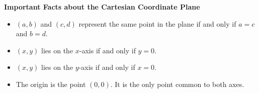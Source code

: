 \colorbox{ResultColor}{\bbm


\centerline{\textbf{Important Facts about the Cartesian Coordinate Plane}}

\begin{itemize}

\item $(a,b)$ and $(c,d)$ represent the same point in the plane if and only if $a = c$ and $b = d$.

\item  $(x,y)$ lies on the $x$-axis if and only if $y = 0$.

\item  $(x,y)$ lies on the $y$-axis if and only if $x=0$.

\item The origin is the point $(0,0)$.  It is the only point common to both axes.


\end{itemize}

\ebm}

\pagebreak


